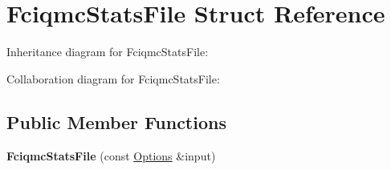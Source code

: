 \hypertarget{structFciqmcStatsFile}{}\section{Fciqmc\+Stats\+File Struct Reference}
\label{structFciqmcStatsFile}


Inheritance diagram for Fciqmc\+Stats\+File\+:


Collaboration diagram for Fciqmc\+Stats\+File\+:
\subsection*{Public Member Functions}
\begin{DoxyCompactItemize}
\item 
{\bfseries Fciqmc\+Stats\+File} (const \hyperlink{structOptions}{Options} \&input)\hypertarget{structFciqmcStatsFile_a077b949e882f2e2d560ef642f2c355bf}{}\label{structFciqmcStatsFile_a077b949e882f2e2d560ef642f2c355bf}

\end{DoxyCompactItemize}
